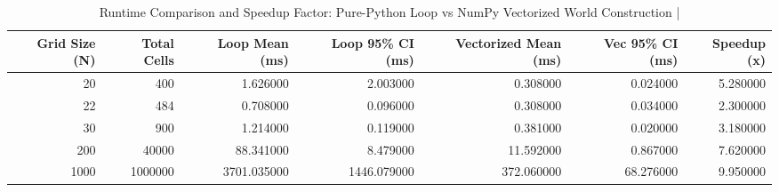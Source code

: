 \begin{table}[htbp]
\centering
\caption{Runtime Comparison and Speedup Factor: Pure-Python Loop vs NumPy Vectorized World Construction | \stampline}
\label{tab:stage1_world_speedup}
\begin{tabular}{rrrrrrr}
\toprule
Grid Size (N) & Total Cells & Loop Mean (ms) & Loop 95\% CI (ms) & Vectorized Mean (ms) & Vec 95\% CI (ms) & Speedup (x) \\
\midrule
20 & 400 & 1.626000 & 2.003000 & 0.308000 & 0.024000 & 5.280000 \\
22 & 484 & 0.708000 & 0.096000 & 0.308000 & 0.034000 & 2.300000 \\
30 & 900 & 1.214000 & 0.119000 & 0.381000 & 0.020000 & 3.180000 \\
200 & 40000 & 88.341000 & 8.479000 & 11.592000 & 0.867000 & 7.620000 \\
1000 & 1000000 & 3701.035000 & 1446.079000 & 372.060000 & 68.276000 & 9.950000 \\
\bottomrule
\end{tabular}

\end{table}
